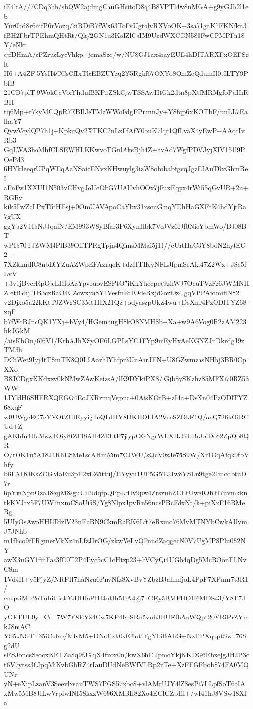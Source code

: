 iE4lrA//7CDq3hb/sbQW2ajdmgCauGHsitoD8q4B8VPTl4w8nMGA+g9yGJh2l1eb
Yur0hd8r6mfP6nVozq/kiRDiB7fWx63ToFvUgtolyRXVoOK+3sa71gaK7FKNfkn3
fBH2FbrTPEhmQHtRt/Qk/2GN1u3KoIZlCsIM9UzdWXCGN580FwCPMPFn18Y/eNkt
cjfDHmA/zFZruzLyeVhkp+jemaSzq/w/NU8GJ1ax4rayEUE4hDITARXFxOEFSzlt
H6+A4ZFj5YsH4CCsCfIxTlcEBZUYzq2Y5Rghf67OXYo8OmZeQdumH0tILTY9PbfB
21CD7plTj9WokCcVoiYhdufBKPnZSkCjwTSSAwHtGk2dtn8pXtfMRMgfoPdHiRBH
tq6Mp+r7kyMCQpR7EBIlJeTMzWWoFdgFPnmnJy+Y8fqp6xKOTbF/nnLL7EalhaY7
QywVcylQP7h1j+KpkuQv2XTKC2nLzFfAfY0buK7lqr1QfLvaX4yEwP+AAqcIvRb3
GqLWA3hoMhfCLSEWHLKKwvoTGnlAksBjh4Z+avAd7WgfPDVJyjXIV151l9POePd3
6HYkIeeqrUPqWEqAaNSaicENvxKHwuylg3izW8obrbabfgvqJgzEIAuT0xGhmReI
aFnFw1XXUI1N503vCHvgJoUeObG7UAUvhOOx7jFuxEqpx4rWi55qGvUR+2u+RGRy
kik5FwZcLPxT5tHEsj+0OmUAVApoCaYbx31xscuGmqYDhHaGXFtK4hdYjtRa7gUX
ggYb2V1IbNJJqniN/EM993W8yBfar3P6XynHbk7VcJVz6IJf0NieYbmWo/BJ08BT
wPIb70TJZWM4PlB39OfiTPRgTpjn4QimsMMai5j11//cUrtHaC3Y8bdN2hytEG2+
7XZkkndlC8nbDiYZuAZWpEFAznqeK+dzHTIKyNFLJfpmSrAkl47Z2Wx+JSc5fLvV
+3v1jBvcrRpOjeLHfoAzYpvouovESPtO7iKkYhccpee9zhWJ7OcuTVzFz6JWMNHZ
ettGhjlTB3czBaO4CZcwxy58Y1VesfnFc1OdeRxjd2ozf0z4lgqVPPAidmiflNS2
v2Djxo5a22kKtT9ZWgSC3Mt1HX21Qz+odyaszpUkZ4wu+DsXn04PzODlTYZ68xqF
b7fWcBJncQK1YXj+bVy4/HGemhugH8kO8NMH8b+Xa+w9A6Vog0R2zAM223hkJGkM
/aisKbOn/6l6V1/KrhAJhXSyOF6LGPLsYC1FYp9mEyHxAeKGNZJnDkrdgJ9zTM3h
DCtWet9Iyj4tTSmTK8Q0L9AarhIYhfpr3UuArrJFN+U8GZwmzasNHbj3BR0CpXXo
B8JCDgxKKdxzv0kNMwZAwKeizsA/lK9DYktPX8/iGjb8ySKzhv85MFXi70BZ53WW
1JYldH6SHFRXQEGO4EoJKRrmqVgpnc+0AisKOtB+zI4u+DsXn04PzODlTYZ68xqF
w9UWgcEC7eYVOtZHlByyigTeQhdHY8DKHOLlA2VeeSZOkF1Q/acQ726kOiRCUd+Z
gAKhfn4HcMsw1Oiy8tZFl8AH4ZELtF7jiypOGNgrWLXRJSibBrJoiDo82ZpQo8QR
O/rOK1u5A18J1RhESMe1scAHm55m7CJWU/sQcV0zJe76S9W/Xr1OqAfqk0fbVhfy
b6FXIKlKsZCGMaEu3pE2xLZ5ttuj/EYyyu1UF5G5TJJw8YSLn9tge21mcdbtuD7r
6pYmNpnOzaJ8ejjM8sguUi19dqfpQPpLHIv9pw4ZrsvuhZCEtUweIORhl7uvmkkn
tkKVJtx5F7UW7nxmCSoUi5S/Yg8NlpxJpvRn56ncsPBcFdxNt/k+piXxF16RMeRg
5UIyOsAwoHHLTdzlV23nEaBN9CkmRaRK6Lft7eRxmo76MvMTNYbCwkAUvmJ7JNhb
m1fbco9fFRgmerVkXz4nLfzJIrOG/zkwVeLvQFnndZaqgecN0V7UgMPSPlu0S2NY
awX3uGY1fmFas3fC0T2P4Pyc5cC1cHtzp23+hVCyQi4UGb4qDg5McROonFLNvC8m
1Vd4H+y5FjyZ/NRFH7haNzu6PnvNfz8XvBvYZbzBJahlnfjoL4PpF7XPmn7t3R1/
enspsiMlr2oTuhiUiokYsHHfaPIH4utIh5DA42j7uGEy5BMFHOH6MDS43/Y8T7JO
yGFTUL9y+Cs+7W7Y8EY84Cw7KP4RrSRn5vuh3HUFfhAzWQpt20VRiPrZYmkJ8mAC
YS5xNSTT35iCcKo/MKM5+DNoFxk0vfClottYgYbiBAhG+NzDPXqaptSwb768g2dU
sFSJbncsSeocxKETZaSq9fJXqX4fxox0n/kwX6hCTpmcYkjKKDG6EbxejgJH2P3c
t6V7ytss36JpqMiKvbGhRZ4rIauDUdNeBWfVLRp2nTe+XzFFGFbobS74FA0MQUNr
yN+eXipLzanV3SeevlxsauTWS7PGS57xbc8+vlAMrUJY4lZ8esPt7LLpfSoT6oIA
xMw5MB8JlLwVrpfwINI58kxzW696XMBIf82Xo4ECICZb1ll+/wI41hJ8VSw18Xfa
